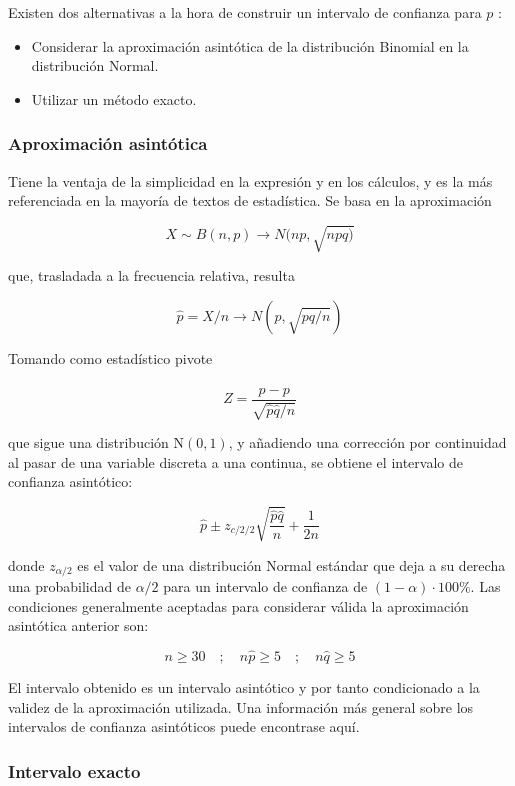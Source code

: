 \documentclass[
]{article}
\providecommand{\tightlist}{%
  \setlength{\itemsep}{0pt}\setlength{\parskip}{0pt}}
\begin{document}
Existen dos alternativas a la hora de construir un intervalo de confianza para \(p\) :

\begin{itemize}
\tightlist
\item
  Considerar la aproximación asintótica de la distribución Binomial en la distribución Normal.
\item
  Utilizar un método exacto.
\end{itemize}

\subsubsection{Aproximación asintótica}\label{aproximaciuxf3n-asintuxf3tica}

Tiene la ventaja de la simplicidad en la expresión y en los cálculos, y es la más referenciada en la mayoría de textos de estadística. Se basa en la aproximación

\[
X \sim B(n, p) \rightarrow N(n p, \sqrt{n p q)}
\]

que, trasladada a la frecuencia relativa, resulta

\[
\hat{p}=X / n \rightarrow N(p, \sqrt{p q / n})
\]

Tomando como estadístico pivote

\[
Z=\frac{\hat{p}-p}{\sqrt{\hat{p} \hat{q} / n}}
\]

que sigue una distribución \(\mathrm{N}(0,1)\), y añadiendo una corrección por continuidad al pasar de una variable discreta a una continua, se obtiene el intervalo de confianza asintótico:

\[
\hat{p} \pm z_{c / 2 / 2} \sqrt{\frac{\hat{p} \hat{q}}{n}}+\frac{1}{2 n}
\]

donde \(z_{\alpha / 2}\) es el valor de una distribución Normal estándar que deja a su derecha una probabilidad de \(\alpha / 2\) para un intervalo de confianza de \((1-\alpha) \cdot 100 \%\). Las condiciones generalmente aceptadas para considerar válida la aproximación asintótica anterior son:

\[
n \geq 30 \quad ; \quad n \hat{p} \geq 5 \quad ; \quad n \hat{q} \geq 5
\]

El intervalo obtenido es un intervalo asintótico y por tanto condicionado a la validez de la aproximación utilizada. Una información más general sobre los intervalos de confianza asintóticos puede encontrase aquí.

\subsubsection{Intervalo exacto}\label{intervalo-exacto}
\end{document}
